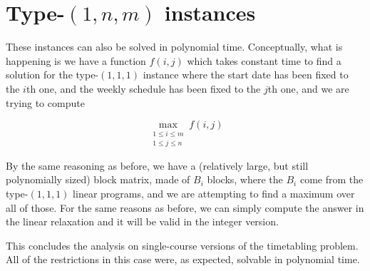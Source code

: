 \section{Type-$(1, n, m)$ instances}

These instances can also be solved in polynomial time. Conceptually, what is happening is we have a function $f(i, j)$ which takes constant time to find a solution for the type-$(1, 1, 1)$ instance where the start date has been fixed to the $i$th one, and the weekly schedule has been fixed to the $j$th one, and we are trying to compute

$$
\max_{\substack{1 \le i \le m\\1 \le j \le n}} f(i, j)
$$

By the same reasoning as before, we have a (relatively large, but still polynomially sized) block matrix, made of $B_i$ blocks, where the $B_i$ come from the type-$(1, 1, 1)$ linear programs, and we are attempting to find a maximum over all of those. For the same reasons as before, we can simply compute the answer in the linear relaxation and it will be valid in the integer version.

This concludes the analysis on single-course versions of the timetabling problem. All of the restrictions in this case were, as expected, solvable in polynomial time.
